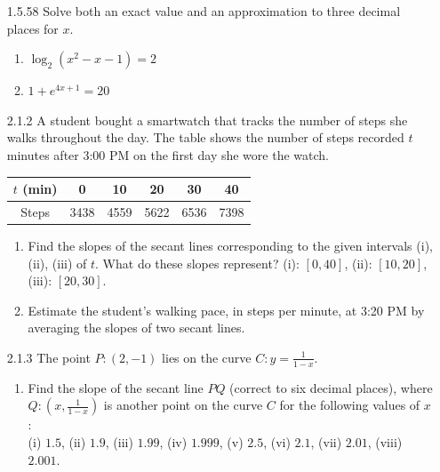 \documentclass{article}
\begin{document}
\begin{enumerate}
        \vspace{6cm}

    \item[1.5.58]
        Solve both an exact value and an approximation to three
        decimal places for $x$.

        \begin{enumerate}
            \item
                $\displaystyle \log_{2}(x^{2} - x - 1) = 2$
            \item
                $\displaystyle 1 + e^{4x+1} = 20$
        \end{enumerate}

    \newpage


    \item[2.1.2]
        A student bought a smartwatch that tracks the number of
        steps she walks throughout the day. The table shows the
        number of steps recorded $t$ minutes after 3:00 PM on the
        first day she wore the watch.

        \begin{center}
            \begin{tabular}{ |c|c|c|c|c|c| }
                 \hline
                 $t$ (min) & 0 & 10 & 20 & 30 & 40 \\
                 \hline
                 Steps & 3438 & 4559 & 5622 & 6536 & 7398 \\
                 \hline
            \end{tabular}
        \end{center}

        \begin{enumerate}
            \item
                Find the slopes of the secant lines corresponding
                to the given intervals (i), (ii), (iii) of $t$. What do these slopes
                represent?
                (i): $[0, 40]$, (ii): $[10, 20]$, (iii): $[20, 30]$.

            \item
                Estimate the student's walking pace,
                in steps per minute, at 3:20 PM by averaging the
                slopes of two secant lines.
        \end{enumerate}

        \vspace{6cm}

    \item[2.1.3]
        The point $P: (2, -1)$ lies on the curve $C: \displaystyle y = \frac{1}{1-x}$.
        \begin{enumerate}
            \item
                Find the slope of the secant line $PQ$ (correct to six decimal places),
                where $\displaystyle Q: \left(x, \frac{1}{1-x}\right)$ is another point
                on the curve $C$ for the following values of $x$: \\
                (i) $1.5$, (ii) $1.9$, (iii) $1.99$, (iv) $1.999$, (v) $2.5$, (vi) $2.1$, (vii) $2.01$, (viii) $2.001$.


\end{enumerate}
\end{enumerate}
\end{document}
